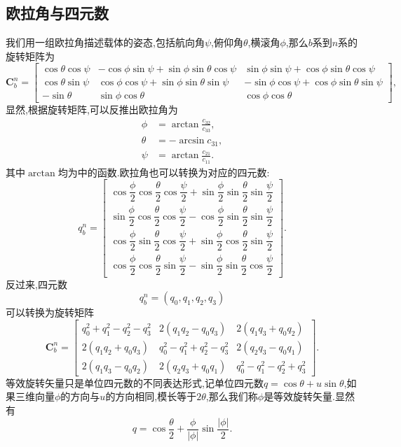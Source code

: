 \documentclass[10pt,a4paper]{ctexart}
\begin{document}
\subsection{欧拉角与四元数}
我们用一组欧拉角描述载体的姿态,包括航向角$\psi$,俯仰角$\theta$,横滚角$\phi$,那么$b$系到$n$系的旋转矩阵为
\[
    \mathbf{C}_b^n = \begin{bmatrix}
        \cos \theta \cos \psi & - \cos \phi \sin \psi + \sin \phi \sin \theta \cos \psi & \sin \phi \sin \psi + \cos \phi \sin \theta \cos \psi   \\
        \cos \theta \sin \psi & \cos \phi \cos \psi + \sin \phi \sin \theta \sin \psi   & - \sin \phi \cos \psi + \cos \phi \sin \theta \sin \psi \\
        - \sin \theta         & \sin \phi \cos \theta                                   & \cos \phi \cos \theta
    \end{bmatrix},
\]
显然,根据旋转矩阵,可以反推出欧拉角为
\begin{align*}
    \phi   & = \arctan \frac{c_{32}}{c_{33}}, \\
    \theta & = - \arcsin c_{31},              \\
    \psi   & = \arctan \frac{c_{21}}{c_{11}}.
\end{align*}
其中$\arctan$均为中的函数.欧拉角也可以转换为对应的四元数:
\[
    q_b^n = \begin{bmatrix}
        \cos \dfrac{ \phi }{2}\cos \dfrac{ \theta }{2}\cos \dfrac{ \psi }{2} + \sin \dfrac{ \phi }{2}\sin \dfrac{ \theta }{2}\sin \dfrac{ \psi }{2}     \\[7pt]
        \sin \dfrac{ \phi }{2}\cos \dfrac{ \theta }{2}\cos \dfrac{ \psi }{ 2} - \cos \dfrac{ \phi }{ 2}\sin \dfrac{ \theta }{ 2}\sin \dfrac{ \psi }{ 2} \\[7pt]
        \cos \dfrac{ \phi }{ 2}\sin \dfrac{ \theta }{ 2}\cos \dfrac{ \psi }{ 2} + \sin \dfrac{ \phi }{ 2}\cos \dfrac{ \theta }{ 2}\sin \dfrac{ \psi }{ 2} \\[7pt]
        \cos \dfrac{ \phi }{ 2}\cos \dfrac{ \theta }{ 2}\sin \dfrac{ \psi }{ 2} - \sin \dfrac{ \phi }{ 2}\sin \dfrac{ \theta }{ 2}\cos \dfrac{ \psi }{ 2}
    \end{bmatrix}.
\]
反过来,四元数
\[
    q_b^n =(q_0,q_1,q_2,q_3)
\]
可以转换为旋转矩阵
\[
    \mathbf{C}_b^n = \begin{bmatrix}
    q_0^2 + q_1^2 - q_2^2 - q_3^2 & 2(q_1q_2 - q_0q_3) & 2(q_1q_3 + q_0q_2) \\
    2(q_1q_2 + q_0q_3) & q_0^2 - q_1^2 + q_2^2 - q_3^2 & 2(q_2q_3 - q_0q_1) \\
    2(q_1q_3 - q_0q_2) & 2(q_2q_3 + q_0q_1) & q_0^2 - q_1^2 - q_2^2 + q_3^2 
    \end{bmatrix}.
\]
等效旋转矢量只是单位四元数的不同表达形式,记单位四元数$q=\cos \theta +u\sin\theta$,如果三维向量$\phi$的方向与$u$的方向相同,模长等于$2\theta$,那么我们称$\phi$是等效旋转矢量.显然有
\begin{equation}\label{eq:rotationVecToQuaternion}
    q = \cos \frac{\theta}{2}  + \frac{ \phi }{|\phi|} \sin\frac{ |\phi| }{2}.
\end{equation}
\end{document}
